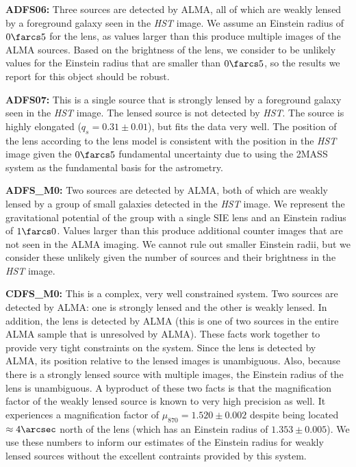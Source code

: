 \documentclass[iop]{emulateapj}
\begin{document}
{\bf ADFS06:} Three sources are detected by ALMA, all of which are weakly
lensed by a foreground galaxy seen in the {\it HST} image.  We assume an
Einstein radius of $0\farcs5$ for the lens, as values larger than this produce
multiple images of the ALMA sources.  Based on the brightness of the lens, we
consider to be unlikely values for the Einstein radius that are smaller than
$0\farcs5$, so the results we report for this object should be robust.

{\bf ADFS07:} This is a single source that is strongly lensed by a foreground
galaxy seen in the {\it HST} image.  The lensed source is not detected by {\it
HST}.  The source is highly elongated ($q_s = 0.31 \pm 0.01$), but fits the
data very well.  The position of the lens according to the lens model is
consistent with the position in the {\it HST} image given the $0\farcs5$
fundamental uncertainty due to using the 2MASS system as the fundamental basis
for the astrometry.

{\bf ADFS\_M0:} Two sources are detected by ALMA, both of which are weakly
lensed by a group of small galaxies detected in the {\it HST} image.  We
represent the gravitational potential of the group with a single SIE lens and
an Einstein radius of $1\farcs0$.  Values larger than this produce additional
counter images that are not seen in the ALMA imaging.  We cannot rule out
smaller Einstein radii, but we consider these unlikely given the number of
sources and their brightness in the {\it HST} image.

{\bf CDFS\_M0:} This is a complex, very well constrained system.  Two sources
are detected by ALMA: one is strongly lensed and the other is weakly lensed.
In addition, the lens is detected by ALMA (this is one of two sources in the
entire ALMA sample that is unresolved by ALMA).  These facts work together to
provide very tight constraints on the system.  Since the lens is detected by
ALMA, its position relative to the lensed images is unambiguous.  Also, because
there is a strongly lensed source with multiple images, the Einstein radius of
the lens is unambiguous.  A byproduct of these two facts is that the
magnification factor of the weakly lensed source is known to very high
precision as well.  It experiences a magnification factor of $\mu_{870} =
1.520\pm0.002$ despite being located $\approx4\arcsec$ north of the lens (which
has an Einstein radius of $1.353\pm0.005$).  We use these numbers to inform our
estimates of the Einstein radius for weakly lensed sources without the
excellent contraints provided by this system.
\end{document}
